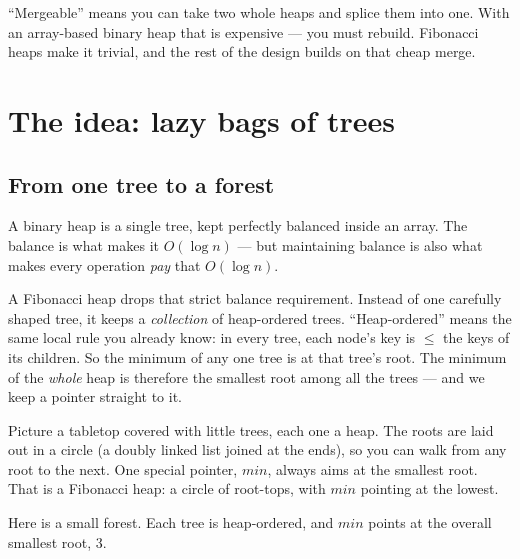 ``Mergeable'' means you can take two
whole heaps and splice them into one. With an array-based binary heap that is
expensive --- you must rebuild. Fibonacci heaps make it trivial, and the
rest of the design builds on that cheap merge.

\section{The idea: lazy bags of trees}

\subsection{From one tree to a forest}

A binary heap is a single tree, kept perfectly balanced inside an array. The
balance is what makes it $O(\log n)$ --- but maintaining balance is also what
makes every operation \emph{pay} that $O(\log n)$.

A Fibonacci heap drops that strict balance requirement. Instead of one carefully shaped
tree, it keeps a \emph{collection} of heap-ordered trees. ``Heap-ordered'' means
the same local rule you already know: in every tree, each node's key is $\le$ the
keys of its children. So the minimum of any one tree is at that tree's root. The
minimum of the \emph{whole} heap is therefore the smallest root among all the
trees --- and we keep a pointer straight to it.

\begin{intuitionbox}
Picture a tabletop covered with little trees, each one a heap. The roots are laid
out in a circle (a doubly linked list joined at the ends), so you can walk from any
root to the next. One special pointer, $\mathit{min}$, always aims at the smallest
root. That is a Fibonacci heap: a circle of root-tops, with $\mathit{min}$ pointing
at the lowest.
\end{intuitionbox}

Here is a small forest. Each tree is heap-ordered, and $\mathit{min}$ points at the
overall smallest root, $3$.

